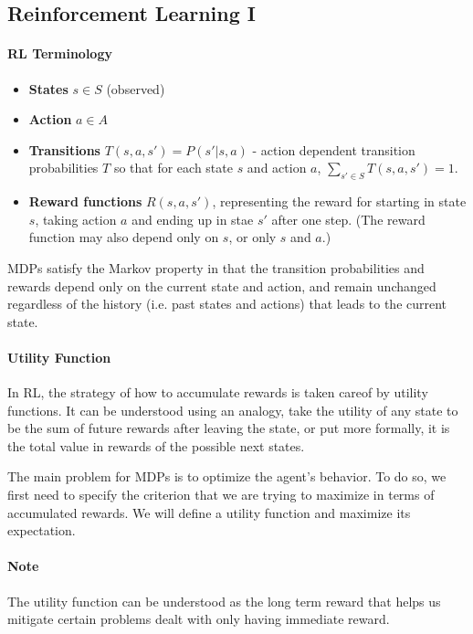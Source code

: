 \documentclass{article}
\begin{document}
\subsection{Reinforcement Learning I}
\paragraph{RL Terminology}
\begin{itemize}
	\item \textbf{States} $s\in S$ (observed)
	\item \textbf{Action} $a\in A$
	\item \textbf{Transitions} $T(s,a,s')=P(s'|s,a)$ - action dependent transition probabilities $T$ so that for each state $s$ and action $a$, $\sum\limits_{s'\in S}T(s,a,s')=1$.
	\item \textbf{Reward functions} $R(s,a,s')$, representing the reward for starting in state $s$, taking action $a$ and ending up in stae $s'$ after one step. (The reward function may also depend only on $s$, or only $s$ and $a$.) 
\end{itemize}

MDPs satisfy the Markov property in that the transition probabilities and rewards depend only on the current state and action, and remain unchanged regardless of the history (i.e. past states and actions) that leads to the current state.

\paragraph{Utility Function}
In RL, the strategy of how to accumulate rewards is taken careof by utility functions. It can be understood using an analogy, take the utility of any state to be the sum of future rewards after leaving the state, or put more formally, it is the total value in rewards of the possible next states.

The main problem for MDPs is to optimize the agent's behavior. To do so, we first need to specify the criterion that we are trying to maximize in terms of accumulated rewards. We will define a utility function and maximize its expectation.

\paragraph{Note} The utility function can be understood as the long term reward that helps us mitigate certain problems dealt with only having immediate reward.
\end{document}
